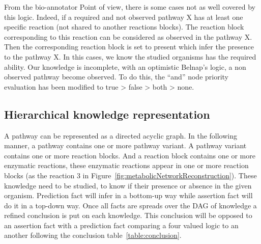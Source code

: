 \documentclass{llncs}
\begin{document}
From the bio-annotator Point of view, there is some cases not as well covered by this logic. Indeed, if a required and not observed pathway X has at least one specific reaction (not shared to another reactions blocks). The reaction block corresponding to this reaction can be considered as observed in the pathway X. Then the corresponding reaction block is set to present which infer the presence to the pathway X. In this cases, we know the studied organisms has the required ability. Our knowledge is incomplete, with an optimistic Belnap's logic, a non observed pathway become observed. To do this, the ``and'' node priority evaluation has been modified  to true > false > both > none.

\subsection{Hierarchical knowledge representation}
A pathway can be represented  as a directed acyclic graph. In the following manner, a pathway contains one or more pathway variant. A pathway variant contains one or more reaction blocks. And a reaction block contains one or more enzymatic reactions, these enzymatic reactions appear in one or more reaction blocks (as the reaction 3 in Figure~\ref{fig:metabolicNetworkReconstruction}). These knowledge need to be studied, to know if their presence or absence in the given organism. Prediction fact will infer in a bottom-up way while assertion fact will do it in a top-down way. Once all facts are spreads over the DAG of knowledge a refined conclusion is put on each knowledge. This conclusion will be opposed to an assertion fact with a prediction fact comparing a four valued logic to an another following the conclusion table~\ref{table:conclusion}.
\end{document}
